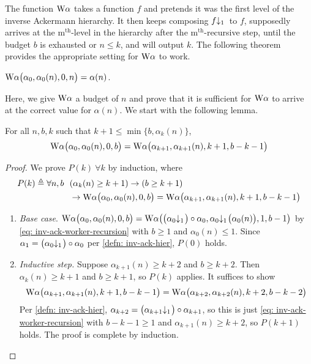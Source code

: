 {\color{magenta}The function $\text{W}\alpha$ takes a function $f$ and pretends it was the first level of the inverse Ackermann hierarchy. It then keeps composing $\cdt{f}{1}\ $ to $f$, supposedly arrives at the $\text{m}^{\text{th}}$-level in the hierarchy after the $\text{m}^{\text{th}}$-recursive step, until the budget $b$ is exhausted or $n\le k$, and will output $k$.} The following theorem provides the appropriate setting for $\text{W}\alpha$ to work.
\begin{thm} \label{thm: inv-ack-worker-correct}
	$\text{W}\alpha\big(\alpha_0, \alpha_0(n), 0, n\big) = \alpha(n)$.
\end{thm}
Here, we give $\text{W}\alpha$ a budget of $n$ and prove that it is sufficient for $\text{W}\alpha$ to arrive at the correct value for $\alpha(n)$. We start with the following lemma.
\begin{lem} \label{lem: inv-ack-worker-intermediate}
	For all $n, b, k$ such that $k+1\le \min\big\{b, \alpha_k(n)\big\}$, \begin{equation*}
	\text{W}\alpha\big(\alpha_0, \alpha_0(n), 0, b\big) = \text{W}\alpha\big(\alpha_{k+1}, \alpha_{k+1}(n), k+1, b-k-1\big)
	\end{equation*}
\end{lem}
\begin{proof}
	 We prove $P(k) \ \forall k$ by induction, where
	 \begin{equation*}
	 \begin{aligned}
	 P(k) \triangleq \forall n, b \ \ & (\alpha_k(n)\ge k+1) \to (b\ge k+1)\\ & \to \text{W}\alpha\big(\alpha_0, \alpha_0(n), 0, b\big) = \text{W}\alpha\big(\alpha_{k+1}, \alpha_{k+1}(n), k+1, b-k-1\big)
	 \end{aligned}
	 \end{equation*}
	\begin{enumerate}[leftmargin=*]
		\item \emph{Base case}. $ \W\alpha\big(\alpha_0, \alpha_0(n), 0, b\big) = \W\alpha\big(\cdt{\big(\alpha_0}{1}\big)\circ \alpha_0, \cdt{\alpha_0}{1}\big(\alpha_0(n)\big), 1, b - 1\big) $ by
		\eqref{eq: inv-ack-worker-recursion} with $b\ge 1$ and $\alpha_0(n)\le 1$. Since $\alpha_1 = \big(\cdt{\alpha_0}{1}\big) \circ \alpha_0$ per \cref{defn: inv-ack-hier}, $P(0)$ holds.
		
		\item \emph{Inductive step.} Suppose $\alpha_{k+1}(n)\ge k+2$ and $b\ge k+2$. Then $\alpha_k(n)\ge k+1$ and $b\ge k+1$, so $P(k)$ applies. It suffices to show
		\begin{equation*}
		\text{W}\alpha\big(\alpha_{k+1}, \alpha_{k+1}(n), k+1, b-k-1\big)
		= \text{W}\alpha\big(\alpha_{k+2}, \alpha_{k+2}(n), k+2, b-k-2\big)
		\end{equation*}
		Per \cref{defn: inv-ack-hier}, $\alpha_{k+2} = \big(\cdt{\alpha_{k+1}}{1}\big)\circ \alpha_{k+1}$, so this is just \eqref{eq: inv-ack-worker-recursion} with $b - k - 1\ge 1$ and $\alpha_{k+1}(n)\ge k+2$, so $P(k+1)$ holds. The proof is complete by induction.\vspace*{-\baselineskip}
	\end{enumerate}
\end{proof}
